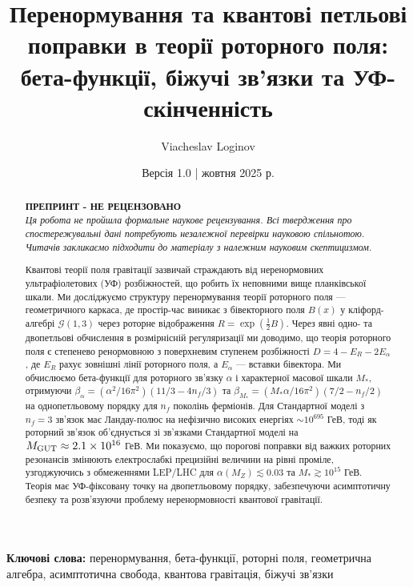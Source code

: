\documentclass[11pt,a4paper]{article}
\title{\textbf{Перенормування та квантові петльові поправки в теорії роторного поля:\\
бета-функції, біжучі зв’язки та УФ-скінченність}}
\author[1]{Viacheslav Loginov}
\affil[1]{Kyiv, Ukraine\\ \texttt{barthez.slavik@gmail.com}}
\date{\small Версія 1.0 \quad|\quad 15 жовтня 2025 р.}
\numberwithin{equation}{section}
\theoremstyle{plain}
\theoremstyle{definition}
\theoremstyle{remark}
\newcommand{\Cl}{\mathcal{G}}               %
\begin{document}
\maketitle

\begin{abstract}
\noindent
\textbf{ПРЕПРИНТ - НЕ РЕЦЕНЗОВАНО}\\
\textit{Ця робота не пройшла формальне наукове рецензування. Всі твердження про спостережувальні дані потребують незалежної перевірки науковою спільнотою. Читачів закликаємо підходити до матеріалу з належним науковим скептицизмом.}

\medskip
\noindent\noindent
Квантові теорії поля гравітації зазвичай страждають від неренормовних ультрафіолетових (УФ) розбіжностей, що робить їх неповними вище планківської шкали. Ми досліджуємо структуру перенормування теорії роторного поля — геометричного каркаса, де простір-час виникає з бівекторного поля $B(x)$ у кліфорд-алгебрі $\Cl(1,3)$ через роторне відображення $R=\exp(\tfrac12 B)$. Через явні одно- та двопетльові обчислення в розмірнісній регуляризації ми доводимо, що теорія роторного поля є степенево ренормовною з поверхневим ступенем розбіжності $D=4-E_R-2E_\alpha$, де $E_R$ рахує зовнішні лінії роторного поля, а $E_\alpha$ — вставки бівектора. Ми обчислюємо бета-функції для роторного зв’язку $\alpha$ і характерної масової шкали $M_*$, отримуючи $\beta_\alpha = (\alpha^2/16\pi^2)(11/3 - 4n_f/3)$ та $\beta_{M_*} = (M_* \alpha/16\pi^2)(7/2 - n_f/2)$ на однопетльовому порядку для $n_f$ поколінь ферміонів. Для Стандартної моделі з $n_f=3$ зв’язок має Ландау-полюс на нефізично високих енергіях $\sim 10^{695}$ ГеВ, тоді як роторний зв’язок об’єднується зі зв’язками Стандартної моделі на $M_{\rm GUT}\approx 2{.}1\times 10^{16}$ ГеВ. Ми показуємо, що порогові поправки від важких роторних резонансів змінюють електрослабкі прецизійні величини на рівні проміле, узгоджуючись з обмеженнями LEP/LHC для $\alpha(M_Z)\lesssim 0{.}03$ та $M_* \gtrsim 10^{15}$ ГеВ. Теорія має УФ-фіксовану точку на двопетльовому порядку, забезпечуючи асимптотичну безпеку та розв’язуючи проблему неренормовності квантової гравітації.
\end{abstract}

\noindent\textbf{Ключові слова:} перенормування, бета-функції, роторні поля, геометрична алгебра, асимптотична свобода, квантова гравітація, біжучі зв’язки

\vspace{1em}

\end{document}

